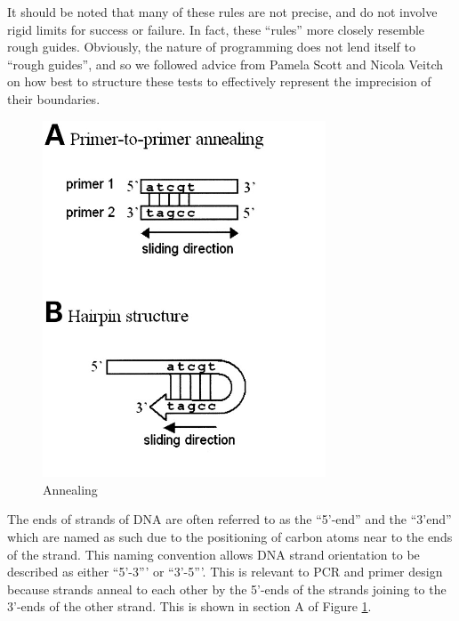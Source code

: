 It should be noted that many of these rules are not precise, and do
not involve rigid limits for success or failure.
In fact, these ``rules'' more closely resemble rough guides.
Obviously, the nature of programming does not lend itself to ``rough
guides'', and so we followed advice from Pamela Scott and Nicola
Veitch on how best to structure these tests to effectively represent
the imprecision of their boundaries.

\begin{figure}[h]
  \begin{center}
    \includegraphics[width=0.75\textwidth]{./images/other/annealing.jpg}
    \caption{
      \label{fig:other:anneal}
      Annealing	
    }
  \end{center}
\end{figure}

The ends of strands of DNA are often referred to as the ``5'-end'' and
the ``3'end'' which are named as such due to the positioning of carbon
atoms near to the ends of the strand. This naming convention allows DNA
strand orientation to be described as either ``5'-3''' or ``3'-5'''.
This is relevant to PCR and primer design because strands anneal to
each other by the 5'-ends of the strands joining to the 3'-ends of the
other strand. This is shown in section A of Figure
\ref{fig:other:anneal}.










